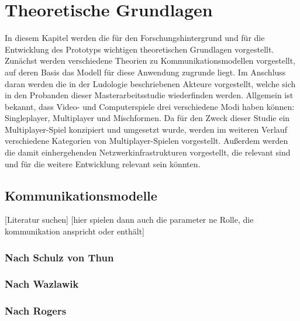 \chapter{Theoretische Grundlagen}\label{sec:basics}

In diesem Kapitel werden die für den Forschungshintergrund und für die Entwicklung des Prototyps wichtigen theoretischen Grundlagen vorgestellt.
Zunächst werden verschiedene Theorien zu Kommunikationsmodellen vorgestellt, auf deren Basis das Modell für diese Anwendung zugrunde liegt.
Im Anschluss daran werden die in der Ludologie beschriebenen Akteure vorgestellt, welche sich in den Probanden dieser Masterarbeitsstudie wiederfinden werden. Allgemein ist bekannt, dass Video- und Computerspiele drei verschiedene Modi haben können: Singleplayer, Multiplayer und Mischformen. Da für den Zweck dieser Studie ein Multiplayer-Spiel konzipiert und umgesetzt wurde, werden im weiteren Verlauf verschiedene Kategorien von Multiplayer-Spielen vorgestellt. Außerdem werden die damit einhergehenden Netzwerkinfrastrukturen vorgestellt, die relevant sind und für die weitere Entwicklung relevant sein könnten.

\section{Kommunikationsmodelle}
[Literatur suchen]
[hier spielen dann auch die parameter ne Rolle, die kommunikation anspricht oder enthält]
\subsection{Nach Schulz von Thun}
\subsection{Nach Wazlawik}
\subsection{Nach Rogers}


